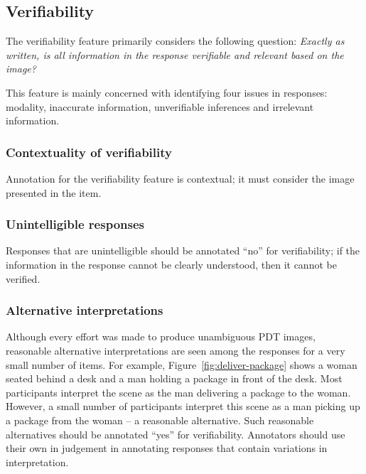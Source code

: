 \documentclass[12pt,notitlepage]{article}
\begin{document}
\subsection{Verifiability} \label{subsec:verifiability}

The verifiability feature primarily considers the following question: \textit{Exactly as written, is all information in the response verifiable and relevant based on the image?}

This feature is mainly concerned with identifying four issues in responses: modality, inaccurate information, unverifiable inferences and irrelevant information. 

\subsubsection{Contextuality of verifiability} Annotation for the verifiability feature is contextual; it must consider the image presented in the item. 

\subsubsection{Unintelligible responses} Responses that are unintelligible should be annotated ``no'' for verifiability; if the information in the response cannot be clearly understood, then it cannot be verified.

\subsubsection{Alternative interpretations} Although every effort was made to produce unambiguous PDT images, reasonable alternative interpretations are seen among the responses for a very small number of items. For example, Figure~\ref{fig:deliver-package} shows a woman seated behind a desk and a man holding a package in front of the desk. Most participants interpret the scene as the man delivering a package to the woman. However, a small number of participants interpret this scene as a man picking up a package from the woman -- a reasonable alternative. Such reasonable alternatives should be annotated ``yes'' for verifiability. Annotators should use their own in judgement in annotating responses that contain variations in interpretation.
\end{document}
